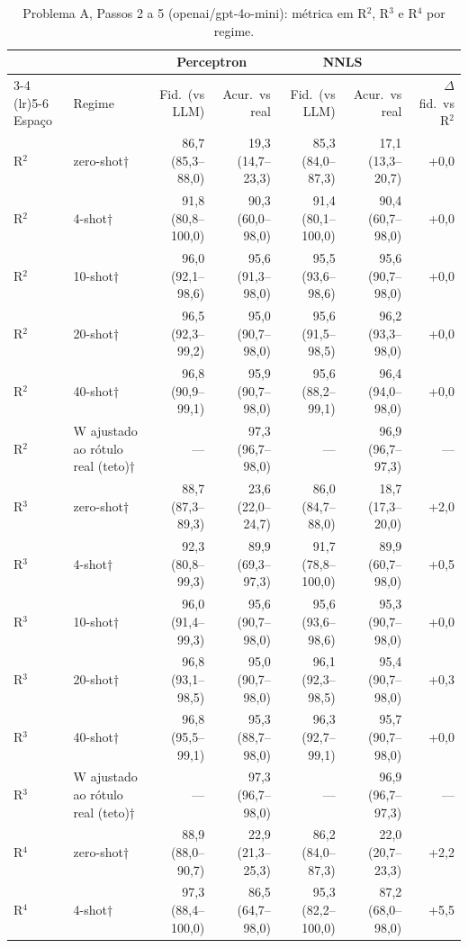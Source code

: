 \begin{table}[htbp]
\centering
\small
\caption{Problema A, Passos 2 a 5 (openai/gpt-4o-mini): métrica em R$^2$, R$^3$ e R$^4$ por regime.}
\label{tab:bloco1_A_passo4_R2_R3_R4_gpt4mini}
\begin{tabular}{llrrrrr}
\toprule
 &  & \multicolumn{2}{c}{Perceptron} & \multicolumn{2}{c}{NNLS} &  \\ \cmidrule(lr){3-4} \cmidrule(lr){5-6}
Espaço & Regime & Fid.\ (vs LLM) & Acur.\ vs real & Fid.\ (vs LLM) & Acur.\ vs real & $\Delta$ fid.\ vs R$^2$ \\
\midrule
R$^2$ & zero-shot† & 86,7 (85,3–88,0) & 19,3 (14,7–23,3) & 85,3 (84,0–87,3) & 17,1 (13,3–20,7) & +0,0 \\
R$^2$ & 4-shot† & 91,8 (80,8–100,0) & 90,3 (60,0–98,0) & 91,4 (80,1–100,0) & 90,4 (60,7–98,0) & +0,0 \\
R$^2$ & 10-shot† & 96,0 (92,1–98,6) & 95,6 (91,3–98,0) & 95,5 (93,6–98,6) & 95,6 (90,7–98,0) & +0,0 \\
R$^2$ & 20-shot† & 96,5 (92,3–99,2) & 95,0 (90,7–98,0) & 95,6 (91,5–98,5) & 96,2 (93,3–98,0) & +0,0 \\
R$^2$ & 40-shot† & 96,8 (90,9–99,1) & 95,9 (90,7–98,0) & 95,6 (88,2–99,1) & 96,4 (94,0–98,0) & +0,0 \\
R$^2$ & W ajustado ao rótulo real (teto)† & — & 97,3 (96,7–98,0) & — & 96,9 (96,7–97,3) & — \\
\midrule
R$^3$ & zero-shot† & 88,7 (87,3–89,3) & 23,6 (22,0–24,7) & 86,0 (84,7–88,0) & 18,7 (17,3–20,0) & +2,0 \\
R$^3$ & 4-shot† & 92,3 (80,8–99,3) & 89,9 (69,3–97,3) & 91,7 (78,8–100,0) & 89,9 (60,7–98,0) & +0,5 \\
R$^3$ & 10-shot† & 96,0 (91,4–99,3) & 95,6 (90,7–98,0) & 95,6 (93,6–98,6) & 95,3 (90,7–98,0) & +0,0 \\
R$^3$ & 20-shot† & 96,8 (93,1–98,5) & 95,0 (90,7–98,0) & 96,1 (92,3–98,5) & 95,4 (90,7–98,0) & +0,3 \\
R$^3$ & 40-shot† & 96,8 (95,5–99,1) & 95,3 (88,7–98,0) & 96,3 (92,7–99,1) & 95,7 (90,7–98,0) & +0,0 \\
R$^3$ & W ajustado ao rótulo real (teto)† & — & 97,3 (96,7–98,0) & — & 96,9 (96,7–97,3) & — \\
\midrule
R$^4$ & zero-shot† & 88,9 (88,0–90,7) & 22,9 (21,3–25,3) & 86,2 (84,0–87,3) & 22,0 (20,7–23,3) & +2,2 \\
R$^4$ & 4-shot† & 97,3 (88,4–100,0) & 86,5 (64,7–98,0) & 95,3 (82,2–100,0) & 87,2 (68,0–98,0) & +5,5 \\

\end{tabular}
\end{table}
